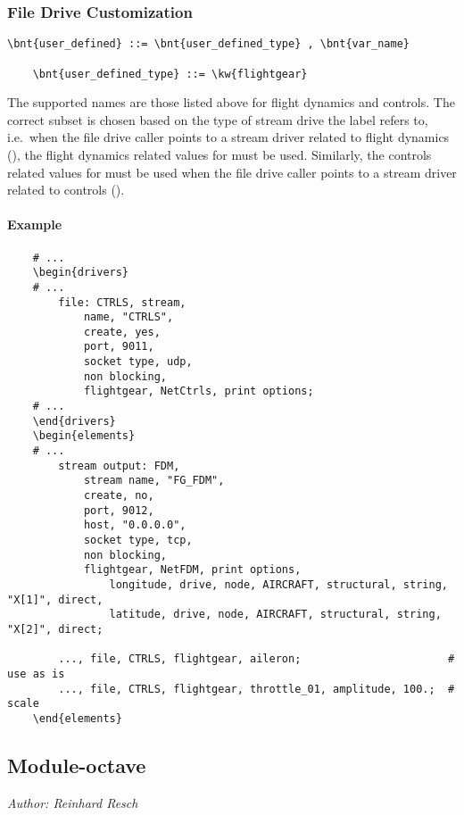 \subsubsection{File Drive Customization}
\begin{Verbatim}[commandchars=\\\{\}]
    \bnt{user_defined} ::= \bnt{user_defined_type} , \bnt{var_name}

    \bnt{user_defined_type} ::= \kw{flightgear}
\end{Verbatim}
The supported names are those listed above for flight dynamics and controls.
The correct subset is chosen based on the type of stream drive the label refers to,
i.e.\ when the file drive caller points to a stream driver related to flight dynamics (),
the flight dynamics related values for  must be used.
Similarly, the controls related values for  must be used when the file drive caller
points to a stream driver related to controls ().

\paragraph{Example}
\begin{verbatim}
    # ...
    \begin{drivers}
    # ...
        file: CTRLS, stream,
            name, "CTRLS",
            create, yes,
            port, 9011,
            socket type, udp,
            non blocking,
            flightgear, NetCtrls, print options;
    # ...
    \end{drivers}
    \begin{elements}
    # ...
        stream output: FDM,
            stream name, "FG_FDM",
            create, no,
            port, 9012,
            host, "0.0.0.0",
            socket type, tcp,
            non blocking,
            flightgear, NetFDM, print options,
                longitude, drive, node, AIRCRAFT, structural, string, "X[1]", direct,
                latitude, drive, node, AIRCRAFT, structural, string, "X[2]", direct;
        
        ..., file, CTRLS, flightgear, aileron;                       # use as is
        ..., file, CTRLS, flightgear, throttle_01, amplitude, 100.;  # scale
    \end{elements}
\end{verbatim}



\subsection{Module-octave}
\emph{Author: Reinhard Resch}

